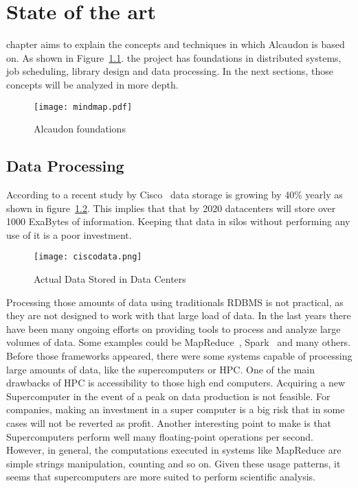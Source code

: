 \chapter{State of the art}
\label{chap:stateoftheart}

 chapter aims to explain the concepts and techniques in which
Alcaudon is based on. As shown in Figure~\ref{fig:mindmap}. the project has foundations in
distributed systems, job scheduling, library design and data processing. In the
next sections, those concepts will be analyzed in more depth.

\begin{figure}[!h]
\begin{center}
\texttt{[image: mindmap.pdf]}
\caption{Alcaudon foundations}
\label{fig:mindmap}
\end{center}
\end{figure}

\section{Data Processing}

According to a recent study by Cisco~\cite{ciscosurvey} data storage is growing
by 40\% yearly as shown in figure~\ref{fig:ciscodata}. This implies that that by
2020 datacenters will store over 1000 ExaBytes of information. Keeping that data
in silos without performing any use of it is a poor investment.

\begin{figure}[!h]
\begin{center}
\texttt{[image: ciscodata.png]}
\caption{Actual Data Stored in Data Centers~\cite{ciscosurvey}}
\label{fig:ciscodata}
\end{center}
\end{figure}

Processing those amounts of data using traditionals RDBMS is not practical, as
they are not designed to work with that large load of data. In the last years
there have been many ongoing efforts on providing tools to process and analyze
large volumes of data. Some examples could be MapReduce~\cite{mapreduce},
Spark~\cite{spark} and many others. Before those frameworks appeared, there were
some systems capable of processing large amounts of data, like the
supercomputers or HPC. One of the main drawbacks of HPC is accessibility to
those high end computers. Acquiring a new  Supercomputer in the event of a peak
on data production is not feasible. For companies, making an investment in a
super computer is a big risk that in some cases will not be reverted as profit.
Another interesting point to make is that Supercomputers perform well many
floating-point operations per second. However, in general, the computations
executed in systems like MapReduce are simple strings manipulation, counting and
so on. Given these usage patterns, it seems that supercomputers are more suited
to perform scientific analysis.

